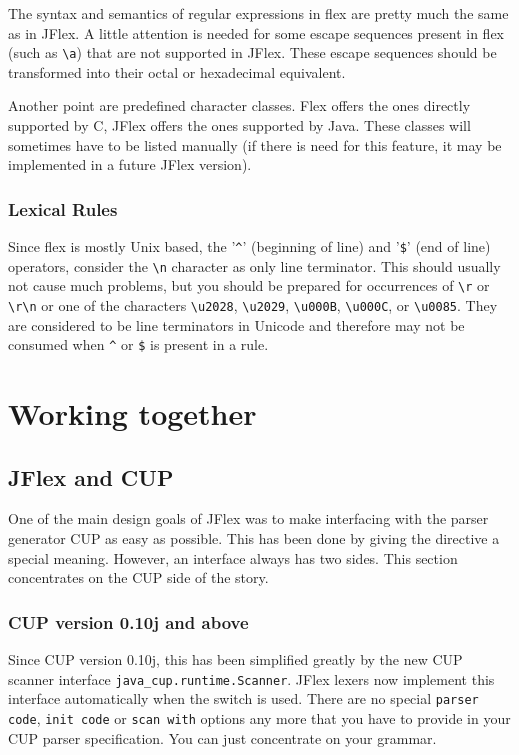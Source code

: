 \documentclass[11pt]{scrartcl}
\begin{document}
The syntax and semantics of regular expressions in flex are pretty much the
same as in JFlex. A little attention is needed for some escape sequences 
present in flex (such as \verb+\a+) that are not supported in JFlex. These
escape sequences should be transformed into their octal or hexadecimal 
equivalent. 

Another point are predefined character classes. Flex offers the ones directly
supported by C, JFlex offers the ones supported by Java. These classes will
sometimes have to be listed manually (if there is need for this feature, it
may be implemented in a future JFlex version).

\subsubsection{Lexical Rules}
Since flex is mostly Unix based, the '\verb+^+' (beginning of line) and
'\verb+$+' (end of line) operators, consider the \verb+\n+ character as %
only line terminator. This should usually not cause much problems, but you
should be prepared for occurrences of \verb+\r+ or \verb+\r\n+ or one of
the characters \verb+\u2028+, \verb+\u2029+, \verb+\u000B+, \verb+\u000C+, 
or \verb+\u0085+. They are considered to be line terminators in Unicode and 
therefore may not be consumed when 
\verb+^+ or \verb+$+ is present in a rule.%

\section{Working together\label{WorkingTog}}

\subsection{JFlex and CUP\label{CUPWork}}
One of the main design goals of JFlex was to make interfacing with the
parser generator CUP \cite{CUP} as easy as possible. 
This has been done by giving
the \texttt{} directive a special meaning. However, an
interface always has two sides. This section concentrates on the
CUP side of the story.

\subsubsection{CUP version 0.10j and above}
Since CUP version 0.10j, this has been simplified greatly by the new 
CUP scanner interface \texttt{java\_cup.runtime.Scanner}. JFlex lexers now implement
this interface automatically when the \texttt{}
switch is used. There are no special \texttt{parser code}, \texttt{init
  code} or \texttt{scan with} options any more that you have to provide
in your CUP parser specification. You can just concentrate on your grammar.
\end{document}

